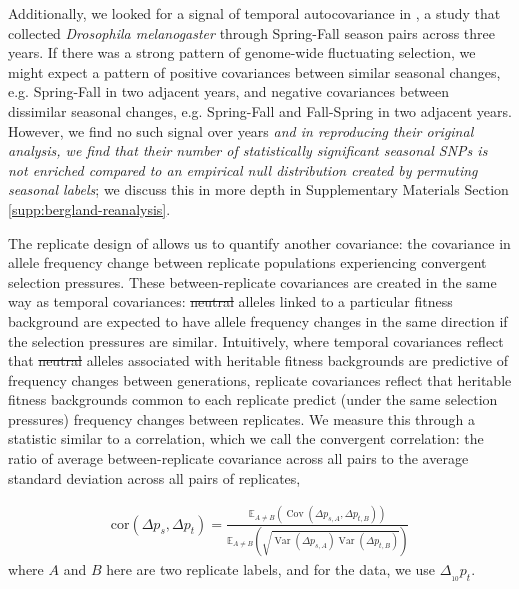 \documentclass[11pt]{article}
\newcommand{\vb}[1]{{\it \color{blue} #1}}
\newcommand{\E}{\mathbb{E}}
\DeclareMathOperator{\var}{Var}
\DeclareMathOperator{\cov}{Cov}
\providecommand{\DIFaddtex}[1]{{\protect\color{blue}\uwave{#1}}} %
\providecommand{\DIFdeltex}[1]{{\protect\color{red}\sout{#1}}}                      %
\providecommand{\DIFaddbegin}{} %
\providecommand{\DIFaddend}{} %
\providecommand{\DIFdelbegin}{} %
\providecommand{\DIFdelend}{} %
\providecommand{\DIFadd}[1]{\texorpdfstring{\DIFaddtex{#1}}{#1}} %
\providecommand{\DIFdel}[1]{\texorpdfstring{\DIFdeltex{#1}}{}} %
\begin{document}
\DIFaddend Additionally, we looked for a signal of temporal autocovariance in
\textcite{Bergland2014-ij}, a study that collected \emph{Drosophila
melanogaster} through Spring-Fall season pairs across three years. If there was
a strong  pattern of genome-wide fluctuating selection, we might expect a
pattern of positive covariances between similar seasonal changes, e.g.
Spring-Fall in two adjacent years, and negative covariances between dissimilar
seasonal changes, e.g. Spring-Fall and Fall-Spring in two adjacent years.
However, we find no such signal over years\DIFaddbegin \DIFadd{, }\vb{and in reproducing their
  original analysis, we find that their number of statistically significant
  seasonal SNPs is not enriched compared to an empirical null distribution
  created by permuting seasonal labels}\DIFaddend ; we discuss this in more depth in
  Supplementary Materials Section \ref{supp:bergland-reanalysis}.

The replicate design of \textcite{Barghi2019-qy} allows us to quantify another
covariance: the covariance in allele frequency change between replicate
populations experiencing convergent selection pressures. These
between-replicate covariances are created in the same way as temporal
covariances: \DIFdelbegin \DIFdel{neutral }\DIFdelend alleles linked to a particular fitness background are
expected to have allele frequency changes in the same direction if the
selection pressures are similar. Intuitively, where temporal covariances
reflect that \DIFdelbegin \DIFdel{neutral }\DIFdelend alleles associated with heritable fitness backgrounds are
predictive of frequency changes between generations, replicate covariances
reflect that heritable fitness backgrounds common to each replicate predict
(under the same selection pressures) frequency changes between replicates. We
measure this through a statistic similar to a correlation, which we call the
convergent correlation: the ratio of average between-replicate covariance
across all pairs to the average standard deviation across all pairs of
replicates, 


\begin{align}
  \label{eq:conv-corr}
  \mathrm{cor}(\Delta p_s, \Delta p_t) = \frac{\E_{A\ne B} \left( \cov(\Delta p_{s,A}, \Delta p_{t,B}) \right)}{\E_{A\ne B} \left( \sqrt{\var(\Delta p_{s,A}) \var(\Delta p_{t,B})} \right)}
\end{align}
%
where $A$ and $B$ here are two replicate labels, and for the
\textcite{Barghi2019-qy} data, we use $\Delta_{_{10}} p_t$.
\end{document}
